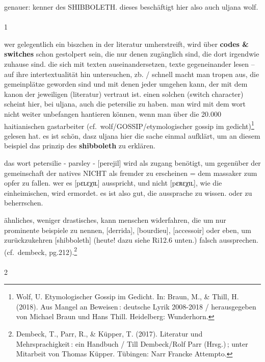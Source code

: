 \documentclass[
  letterpaper,
  DIV=11,
  numbers=noendperiod]{scrartcl}
\makeatletter
\let\oldparagraph\paragraph
\renewcommand{\paragraph}{
    \@ifstar
      \xxxParagraphStar
      \xxxParagraphNoStar
  }
\newcommand{\xxxParagraphStar}[1]{\oldparagraph*{#1}\mbox{}}
\newcommand{\xxxParagraphNoStar}[1]{\oldparagraph{#1}\mbox{}}
\makeatother
\begin{document}
genauer: kenner des SHIBBOLETH. dieses beschäftigt hier also auch uljana
wolf.

\paragraph{1}\label{section}

wer gelegentlich ein biszchen in der literatur umherstreift, wird über
\textbf{codes \& switches} schon gestolpert sein, die nur denen
zugänglich sind, die dort irgendwie zuhause sind. die sich mit texten
auseinandersetzen, texte gegeneinander lesen -- auf ihre
intertextualität hin untersuchen, zb. / schnell macht man tropen aus,
die gemeinplätze geworden sind und mit denen jeder umgehen kann, der mit
dem kanon der jeweiligen (literatur) vertraut ist. einen solchen (switch
character) scheint hier, bei uljana, auch die petersilie zu haben. man
wird mit dem wort nicht weiter unbefangen hantieren können, wenn man
über die 20.000 haitianischen gastarbeiter
(cf.~wolf/GOSSIP/etymologischer gossip im gedicht)\footnote{Wolf, U.
  Etymologischer Gossip im Gedicht. In: Braun, M., \& Thill, H. (2018).
  Aus Mangel an Beweisen\,: deutsche Lyrik 2008-2018 / herausgegeben von
  Michael Braun und Hans Thill. Heidelberg: Wunderhorn.} gelesen hat. es
ist schön, dasz uljana hier die sache einmal aufklärt, um an diesem
beispiel das prinzip des \textbf{shibboleth} zu erklären.

das wort petersilie - parsley - {[}perejil{]} wird als zugang benötigt,
um gegenüber der gemeinschaft der natives NICHT als fremder zu
erscheinen = dem massaker zum opfer zu fallen. wer es
{[}p{\ipafont ɛʟɛ}χ{\ipafont ɪʟ}{]} ausspricht, und nicht
{[}p{\ipafont ɛʀɛ}χ{\ipafont ɪʟ}{]}, wie die einheimischen, wird
ermordet. es ist also gut, die aussprache zu wissen. oder zu
beherrschen.

ähnliches, weniger drastisches, kann menschen widerfahren, die um nur
prominente beispiele zu nennen, {[}derrida{]}, {[}bourdieu{]},
{[}accessoir{]} oder eben, um zurückzukehren {[}shibboleth{]} (heute!
dazu siehe Ri12.6 unten.) falsch aussprechen. (cf.~dembeck,
pg.212).\footnote{Dembeck, T., Parr, R., \& Küpper, T. (2017). Literatur
  und Mehrsprachigkeit\,: ein Handbuch / Till Dembeck/Rolf Parr
  (Hrsg.)\,; unter Mitarbeit von Thomas Küpper. Tübingen: Narr Francke
  Attempto.}

\paragraph{2}\label{section-1}
\end{document}
